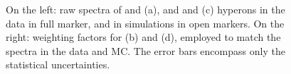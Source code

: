 \begin{figure}[!t]
\hspace*{-1.5cm}
\hspace*{-1.5cm}
\caption{On the left: raw \pT spectra of \rmXiM and \rmAxiP (a), and \rmOmegaM and \rmAomegaP (c) hyperons in the data in full marker, and in simulations in open markers. On the right: weighting factors for \rmXiPM (b) and \rmOmegaPM (d), employed to match the \pT spectra in the data and MC. The error bars encompass only the statistical uncertainties.}
	\label{fig:PtSpectra}
\end{figure}


